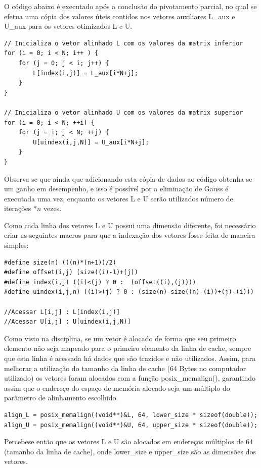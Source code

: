 \documentclass[12pt]{article}
\begin{document}
O código abaixo é executado após a conclusão do pivotamento parcial, no qual se efetua uma cópia dos valores úteis contidos nos vetores auxiliares L\_aux e U\_aux para os vetores otimizados L e U.

\begin{lstlisting}
// Inicializa o vetor alinhado L com os valores da matrix inferior
for (i = 0; i < N; i++ ) {
    for (j = 0; j < i; j++) {
        L[index(i,j)] = L_aux[i*N+j];
    }
}

// Inicializa o vetor alinhado U com os valores da matrix superior
for (i = 0; i < N; ++i) {
    for (j = i; j < N; ++j) {
        U[uindex(i,j,N)] = U_aux[i*N+j];
    }
}
\end{lstlisting}

Observa-se que ainda que adicionando esta cópia de dados ao código obtenha-se um ganho em desempenho, e isso é possível por a eliminação de Gauss é executada uma vez, enquanto os vetores L e U serão utilizados número de iterações $* n$ vezes.

Como cada linha dos vetores L e U possui uma dimensão diferente, foi necessário criar as seguintes macros para que a indexação dos vetores fosse feita de maneira simples:

\begin{lstlisting}
#define size(n) (((n)*(n+1))/2)
#define offset(i,j) (size((i)-1)+(j))
#define index(i,j) ((i)<(j) ? 0 :  (offset((i),(j))))
#define uindex(i,j,n) ((i)>(j) ? 0 : (size(n)-size((n)-(i))+(j)-(i)))

//Acessar L[i,j] : L[index(i,j)]
//Acessar U[i,j] : U[uindex(i,j,N)]
\end{lstlisting}

Como visto na disciplina, se um vetor é alocado de forma que seu primeiro elemento não seja mapeado para o primeiro elemento da linha de cache, sempre que esta linha é acessada há dados que são trazidos e não utilizados. Assim, para melhorar a utilização do tamanho da linha de cache (64 Bytes no computador utilizado) os vetores foram alocados com a função posix\_memalign(), garantindo assim que o endereço do espaço de memória alocado seja um múltiplo do parâmetro de alinhamento escolhido.

\begin{lstlisting}
align_L = posix_memalign((void**)&L, 64, lower_size * sizeof(double));
align_U = posix_memalign((void**)&U, 64, upper_size * sizeof(double));
\end{lstlisting}

Percebe\-se então que os vetores L e U são alocados em endereços múltiplos de 64 (tamanho da linha de cache), onde lower\_size e upper\_size são as dimensões dos vetores.
\end{document}
